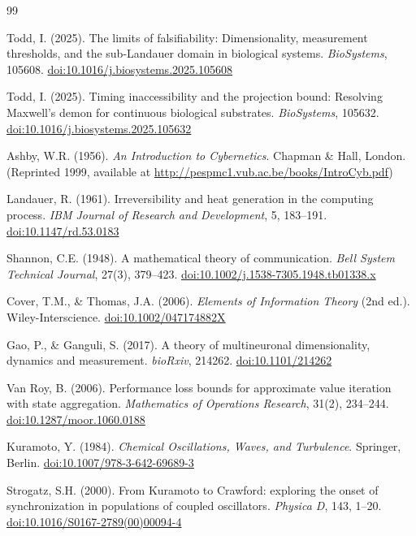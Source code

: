\documentclass[12pt]{article}
\begin{document}
\begin{thebibliography}{99}

Todd, I. (2025). The limits of falsifiability: Dimensionality, measurement thresholds, and the sub-Landauer domain in biological systems. \textit{BioSystems}, 105608. \href{https://doi.org/10.1016/j.biosystems.2025.105608}{doi:10.1016/j.biosystems.2025.105608}

Todd, I. (2025). Timing inaccessibility and the projection bound: Resolving Maxwell's demon for continuous biological substrates. \textit{BioSystems}, 105632. \href{https://doi.org/10.1016/j.biosystems.2025.105632}{doi:10.1016/j.biosystems.2025.105632}

Ashby, W.R. (1956). \textit{An Introduction to Cybernetics}. Chapman \& Hall, London. (Reprinted 1999, available at \url{http://pespmc1.vub.ac.be/books/IntroCyb.pdf})

Landauer, R. (1961). Irreversibility and heat generation in the computing process. \textit{IBM Journal of Research and Development}, 5, 183--191. \href{https://doi.org/10.1147/rd.53.0183}{doi:10.1147/rd.53.0183}

Shannon, C.E. (1948). A mathematical theory of communication. \textit{Bell System Technical Journal}, 27(3), 379--423. \href{https://doi.org/10.1002/j.1538-7305.1948.tb01338.x}{doi:10.1002/j.1538-7305.1948.tb01338.x}

Cover, T.M., \& Thomas, J.A. (2006). \textit{Elements of Information Theory} (2nd ed.). Wiley-Interscience. \href{https://doi.org/10.1002/047174882X}{doi:10.1002/047174882X}

Gao, P., \& Ganguli, S. (2017). A theory of multineuronal dimensionality, dynamics and measurement. \textit{bioRxiv}, 214262. \href{https://doi.org/10.1101/214262}{doi:10.1101/214262}

Van Roy, B. (2006). Performance loss bounds for approximate value iteration with state aggregation. \textit{Mathematics of Operations Research}, 31(2), 234--244. \href{https://doi.org/10.1287/moor.1060.0188}{doi:10.1287/moor.1060.0188}

Kuramoto, Y. (1984). \textit{Chemical Oscillations, Waves, and Turbulence}. Springer, Berlin. \href{https://doi.org/10.1007/978-3-642-69689-3}{doi:10.1007/978-3-642-69689-3}

Strogatz, S.H. (2000). From Kuramoto to Crawford: exploring the onset of synchronization in populations of coupled oscillators. \textit{Physica D}, 143, 1--20. \href{https://doi.org/10.1016/S0167-2789(00)00094-4}{doi:10.1016/S0167-2789(00)00094-4}


\end{thebibliography}
\end{document}
